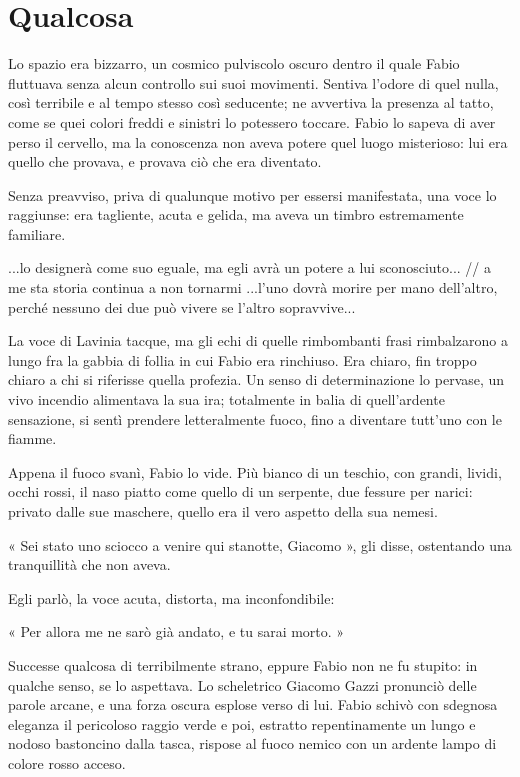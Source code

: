 \chapter{Qualcosa}

Lo spazio era bizzarro, un cosmico pulviscolo oscuro dentro il quale Fabio fluttuava senza alcun controllo sui suoi movimenti. Sentiva l'odore di quel nulla, così terribile e al tempo stesso così seducente; ne avvertiva la presenza al tatto, come se quei colori freddi e sinistri lo potessero toccare. Fabio lo sapeva di aver perso il cervello, ma la conoscenza non aveva potere quel luogo misterioso: lui era quello che provava, e provava ciò che era diventato.

Senza preavviso, priva di qualunque motivo per essersi manifestata, una voce lo raggiunse: era tagliente, acuta e gelida, ma aveva un timbro estremamente familiare.

...lo designerà come suo eguale, ma egli avrà un potere a lui sconosciuto... // a me sta storia continua a non tornarmi
...l'uno dovrà morire per mano dell'altro, perché nessuno dei due può vivere se l'altro sopravvive...

La voce di Lavinia tacque, ma gli echi di quelle rimbombanti frasi rimbalzarono a lungo fra la gabbia di follia in cui Fabio era rinchiuso. Era chiaro, fin troppo chiaro a chi si riferisse quella profezia. Un senso di determinazione lo pervase, un vivo incendio alimentava la sua ira; totalmente in balia di quell'ardente sensazione, si sentì prendere letteralmente fuoco, fino a diventare tutt'uno con le fiamme.

Appena il fuoco svanì, Fabio lo vide. Più bianco di un teschio, con grandi, lividi, occhi rossi, il naso piatto come quello di un serpente, due fessure per narici: privato dalle sue maschere, quello era il vero aspetto della sua nemesi.

« Sei stato uno sciocco a venire qui stanotte, Giacomo », gli disse, ostentando una tranquillità che non aveva.

Egli parlò, la voce acuta, distorta, ma inconfondibile:

« Per allora me ne sarò già andato, e tu sarai morto. »

Successe qualcosa di terribilmente strano, eppure Fabio non ne fu stupito: in qualche senso, se lo aspettava. Lo scheletrico Giacomo Gazzi pronunciò delle parole arcane, e una forza oscura esplose verso di lui. Fabio schivò con sdegnosa eleganza il pericoloso raggio verde e poi, estratto repentinamente un lungo e nodoso bastoncino dalla tasca, rispose al fuoco nemico con un ardente lampo di colore rosso acceso.

